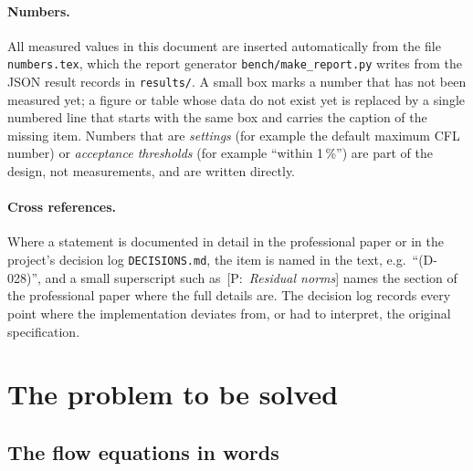 \documentclass[11pt,a4paper]{article}
\newcommand{\cfpendingmark}{\fbox{\scriptsize pending}}
\newcommand{\code}[1]{\texttt{#1}}
\newcommand{\pro}[1]{\ {\small[P:~\textit{#1}]}}
\begin{document}
\paragraph{Numbers.} All measured values in this document are inserted
automatically from the file \code{numbers.tex}, which the report generator
\code{bench/make\_report.py} writes from the JSON result records in
\code{results/}. A small box \cfpendingmark{} marks a number that has not
been measured yet; a figure or table whose data do not exist yet is
replaced by a single numbered line that starts with the same box and
carries the caption of the missing item. Numbers that are \emph{settings} (for example the
default maximum CFL number) or \emph{acceptance thresholds} (for example
``within 1\,\%'') are part of the design, not measurements, and are written
directly.

\paragraph{Cross references.} Where a statement is documented in detail in
the professional paper or in the project's decision log
\code{DECISIONS.md}, the item is named in the text, e.g.\ ``(D-028)'', and a small superscript
such as\pro{Residual norms} names the section of the professional paper
where the full details are.
The decision log records every point where the implementation deviates
from, or had to interpret, the original specification.

\section{The problem to be solved}\label{sec:problem}

\subsection{The flow equations in words}
\end{document}
